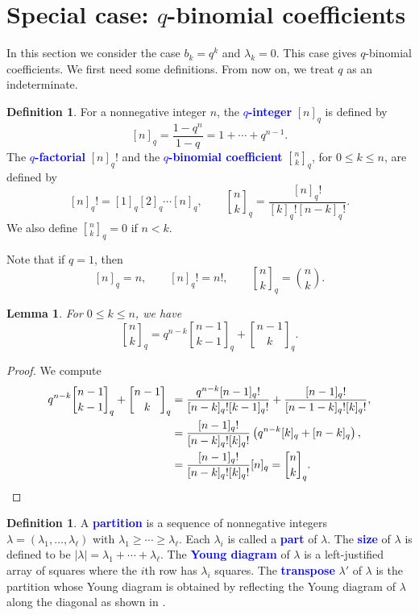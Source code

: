 \documentclass[oneside]{book}
\numberwithin{equation}{section}
\newtheorem{lem}[thm]{Lemma}
\theoremstyle{definition}
\newtheorem{defn}[thm]{Definition}
\newcommand\Qbinom[3]{\genfrac{[}{]}{0pt}{}{#1}{#2}_{#3}}
\newcommand\qbinom[2]{\Qbinom{#1}{#2}{q}}
\renewcommand\emph[1]{\textcolor{blue}{\bf #1}}
\begin{document}
\section{Special case: \( q \)-binomial coefficients}

In this section we consider the case \( b_k=q^k \) and
\( \lambda_k=0 \). This case gives \( q \)-binomial coefficients. We
first need some definitions. From now on, we treat \( q \) as an indeterminate.


\begin{defn}\label{def:2}
  For a nonnegative integer \( n \),
  the \emph{\( q \)-integer} \( [n]_q \) is defined by
  \[
    [n]_q = \frac{1-q^n}{1-q} = 1 + \cdots + q^{n-1}.
  \]
  The \emph{\( q \)-factorial} \( [n]_q! \) and the
  \emph{\( q \)-binomial coefficient} \( \qbinom{n}{k} \), for
  \( 0\le k\le n \), are defined by
  \[
    [n]_q! = [1]_q [2]_q \cdots [n]_q, \qquad
    \qbinom{n}{k} = \frac{[n]_q!}{[k]_q![n-k]_q!}.
  \]
  We also define \( \qbinom{n}{k} = 0 \) if \( n<k \).
\end{defn}


Note that if \( q=1 \), then
\[
  [n]_q = n, \qquad [n]_q! = n!, \qquad \qbinom{n}{k} = \binom{n}{k}.
\]

\begin{lem}\label{lem:2}
  For \( 0\le k\le n \), we have
  \begin{equation}\label{eq:35}
    \qbinom{n}{k} =  q^{n-k} \qbinom{n-1}{k-1} + \qbinom{n-1}{k}.
  \end{equation}
\end{lem}

\begin{proof}
  We compute
  \begin{align*}
    q^{n-k} \qbinom{n-1}{k-1} + \qbinom{n-1}{k}
    &= \frac{q^{n-k}[n-1]_q!}{[n-k]_q! [k-1]_q!}
    + \frac{[n-1]_q!}{[n-1-k]_q! [k]_q!},\\
    &= \frac{[n-1]_q!}{[n-k]_q! [k]_q!} \left( q^{n-k}[k]_q + [n-k]_q \right),\\
    &= \frac{[n-1]_q!}{[n-k]_q! [k]_q!} [n]_q = \qbinom{n}{k}. \qedhere
  \end{align*}
\end{proof}


\begin{defn}\label{def:3}
  A \emph{partition} is a sequence of nonnegative integers
  \( \lambda=(\lambda_1,\dots,\lambda_\ell) \) with
  \( \lambda_1 \ge \cdots \ge \lambda_\ell \). Each \( \lambda_i \) is
  called a \emph{part} of \( \lambda \). The \emph{size} of
  \( \lambda \) is defined to be
  \( |\lambda| = \lambda_1 + \cdots + \lambda_\ell \). The \emph{Young
    diagram} of \( \lambda \) is a left-justified array of squares
  where the \( i \)th row has \( \lambda_i \) squares.
  The \emph{transpose} \( \lambda' \) of \( \lambda \)
  is the partition whose Young diagram is obtained by reflecting
  the Young diagram of \( \lambda \) along the diagonal as shown in 
  .
\end{defn}
\end{document}
